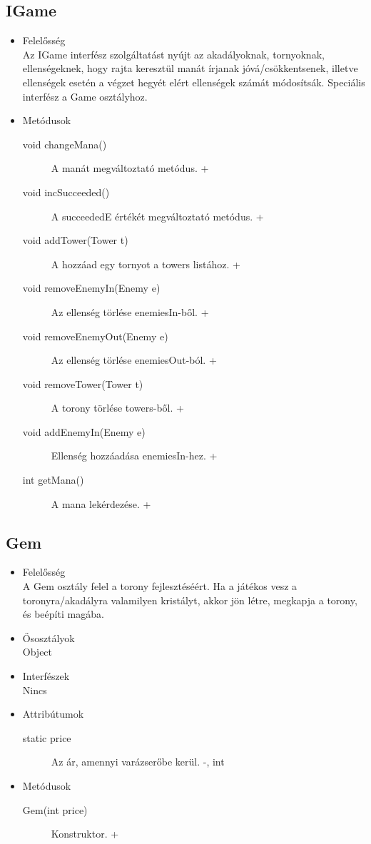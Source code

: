 \subsection{IGame}
\begin{itemize}
\item Felelősség\\
Az IGame interfész szolgáltatást nyújt az akadályoknak, tornyoknak, ellenségeknek, hogy rajta keresztül manát írjanak jóvá/csökkentsenek, illetve ellenségek esetén a végzet hegyét elért ellenségek számát módosítsák. Speciális interfész a Game osztályhoz. 

\item Metódusok\\
	\begin{description}
		\item[void changeMana()] A manát megváltoztató metódus. +
\item[void incSucceeded()] A succeededE értékét megváltoztató metódus. +
\item[void addTower(Tower t)] A hozzáad egy tornyot a towers listához. +
\item[void removeEnemyIn(Enemy e)] Az ellenség törlése enemiesIn-ből. +
\item[void removeEnemyOut(Enemy e)] Az ellenség törlése enemiesOut-ból. +
\item[void removeTower(Tower t)] A torony törlése towers-ből. +
\item[void addEnemyIn(Enemy e)] Ellenség hozzáadása enemiesIn-hez. +
\item[int getMana()] A mana lekérdezése. +


		
	\end{description}
\end{itemize}

\subsection{Gem}
\begin{itemize}
\item Felelősség\\
A Gem osztály felel a torony fejlesztéséért. Ha a játékos vesz a toronyra/akadályra valamilyen kristályt, akkor jön létre, megkapja a torony, és beépíti magába. 
\item Ősosztályok\\
Object
\item Interfészek\\
Nincs
\item Attribútumok\\
	\begin{description}
		\item[static price] Az ár, amennyi varázserőbe kerül. -, int
	\end{description}
\item Metódusok\\
	\begin{description}
		
		\item[Gem(int price)] Konstruktor. +
		
		
	\end{description}
\end{itemize}

